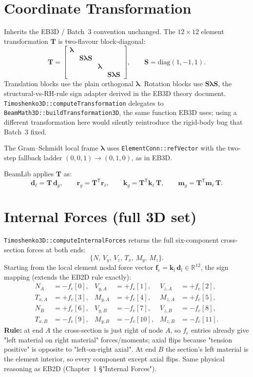 \documentclass[11pt,a4paper]{article}
\newcommand{\bmath}[1]{\boldsymbol{#1}}
\newcommand{\Sdiag}{\bmath{S}}
\newcommand{\lam}{\bmath{\lambda}}
\begin{document}
\section{Coordinate Transformation}

Inherits the EB3D / Batch~3 convention unchanged. The $12\times 12$ element transformation $\bmath{T}$ is two-flavour block-diagonal:
\[
\bmath{T} = \begin{bmatrix}
\lam & & & \\
& \Sdiag\lam\Sdiag & & \\
& & \lam & \\
& & & \Sdiag\lam\Sdiag
\end{bmatrix},
\qquad
\Sdiag = \mathrm{diag}(1, -1, 1).
\]
Translation blocks use the plain orthogonal $\lam$. Rotation blocks use $\Sdiag\lam\Sdiag$, the structural-vs-RH-rule sign adapter derived in the EB3D theory document. \texttt{Timoshenko3D::computeTransformation} delegates to \texttt{BeamMath3D::buildTransformation3D}, the same function EB3D uses; using a different transformation here would silently reintroduce the rigid-body bug that Batch~3 fixed.

The Gram--Schmidt local frame $\lam$ uses \texttt{ElementConn::refVector} with the two-step fallback ladder $(0,0,1) \to (0,1,0)$, as in EB3D.

BeamLib applies $\bmath{T}$ as:
\[
\bmath{d}_\ell = \bmath{T}\,\bmath{d}_g, \qquad
\bmath{r}_g = \bmath{T}^\mathsf{T}\bmath{r}_\ell, \qquad
\bmath{k}_g = \bmath{T}^\mathsf{T}\bmath{k}_\ell\,\bmath{T}, \qquad
\bmath{m}_g = \bmath{T}^\mathsf{T}\bmath{m}_\ell\,\bmath{T}.
\]

\section{Internal Forces (full 3D set)}

\texttt{Timoshenko3D::computeInternalForces} returns the full six-component cross-section forces at both ends:
\[
\{N,\, V_y,\, V_z,\, T_x,\, M_y,\, M_z\}.
\]
Starting from the local element nodal force vector $\bmath{f}_e = \bmath{k}_l\,\bmath{d}_l \in \mathbb{R}^{12}$, the sign mapping (extends the EB2D rule exactly):
\begin{align*}
N_A   &= -f_e[0],   & V_{y,A} &= +f_e[1],   & V_{z,A} &= +f_e[2], \\
T_{x,A} &= +f_e[3], & M_{y,A} &= +f_e[4],   & M_{z,A} &= +f_e[5], \\
N_B   &= +f_e[6],   & V_{y,B} &= -f_e[7],   & V_{z,B} &= -f_e[8], \\
T_{x,B} &= -f_e[9], & M_{y,B} &= -f_e[10],  & M_{z,B} &= -f_e[11].
\end{align*}
\textbf{Rule:} at end $A$ the cross-section is just right of node $A$, so $f_e$ entries already give "left material on right material" forces/moments; axial flips because "tension positive" is opposite to "left-on-right axial". At end $B$ the section's left material is the element interior, so every component except axial flips. Same physical reasoning as EB2D (Chapter~1 \S"Internal Forces").
\end{document}
